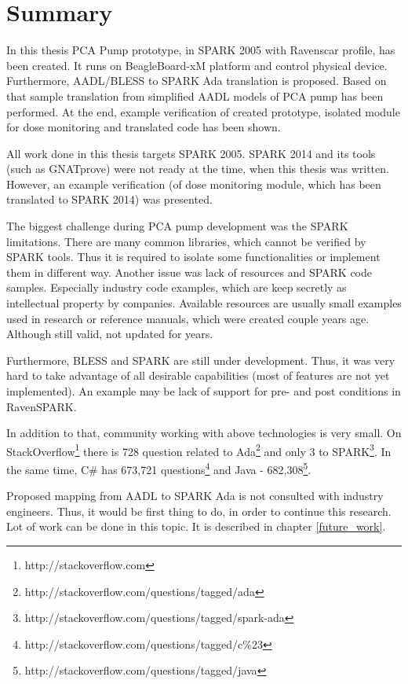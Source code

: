 
\cleardoublepage

\chapter{Summary}
\label{summary}

In this thesis PCA Pump prototype, in SPARK 2005 with Ravenscar profile, has been created. It runs on BeagleBoard-xM platform and control physical device. Furthermore, AADL/BLESS to SPARK Ada translation is proposed. Based on that sample translation from simplified AADL models of PCA pump has been performed. At the end, example verification of created prototype, isolated module for dose monitoring and translated code has been shown. 

All work done in this thesis targets SPARK 2005. SPARK 2014 and its tools (such as GNATprove) were not ready at the time, when this thesis was written. However, an example verification (of dose monitoring module, which has been translated to SPARK 2014) was presented.

The biggest challenge during PCA pump development was the SPARK limitations. There are many common libraries, which cannot be verified by SPARK tools. Thus it is required to isolate some functionalities or implement them in different way. Another issue was lack of resources and SPARK code samples. Especially industry code examples, which are keep secretly as intellectual property by companies. Available resources are usually small examples used in research or reference manuals, which were created couple years age. Although still valid, not updated for years.

Furthermore, BLESS and SPARK are still under development. Thus, it was very hard to take advantage of all desirable capabilities (most of features are not yet implemented). An example may be lack of support for pre- and post conditions in RavenSPARK.

In addition to that, community working with above technologies is very small. On StackOverflow\footnote{http://stackoverflow.com} there is 728 question related to Ada\footnote{http://stackoverflow.com/questions/tagged/ada} and only 3 to SPARK\footnote{http://stackoverflow.com/questions/tagged/spark-ada}. In the same time, C\# has 673,721 questions\footnote{http://stackoverflow.com/questions/tagged/c\%23} and Java - 682,308\footnote{http://stackoverflow.com/questions/tagged/java}.

Proposed mapping from AADL to SPARK Ada is not consulted with industry engineers. Thus, it would be first thing to do, in order to continue this research. Lot of work can be done in this topic. It is described in chapter \ref{future_work}.